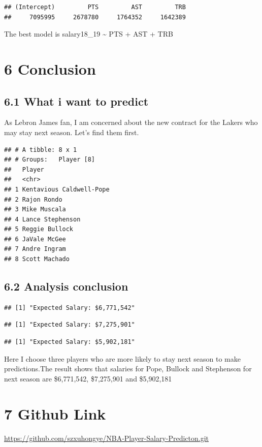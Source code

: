 \documentclass[]{article}
\begin{document}
\begin{verbatim}
## (Intercept)         PTS         AST         TRB 
##     7095995     2678780     1764352     1642389
\end{verbatim}

The best model is salary18\_19 \textasciitilde{} PTS + AST + TRB

\section{6 Conclusion}\label{conclusion}

\subsection{6.1 What i want to predict}\label{what-i-want-to-predict}

As Lebron James fan, I am concerned about the new contract for the
Lakers who may stay next season. Let's find them first.

\begin{verbatim}
## # A tibble: 8 x 1
## # Groups:   Player [8]
##   Player                  
##   <chr>                   
## 1 Kentavious Caldwell-Pope
## 2 Rajon Rondo             
## 3 Mike Muscala            
## 4 Lance Stephenson        
## 5 Reggie Bullock          
## 6 JaVale McGee            
## 7 Andre Ingram            
## 8 Scott Machado
\end{verbatim}

\subsection{6.2 Analysis conclusion}\label{analysis-conclusion}

\begin{verbatim}
## [1] "Expected Salary: $6,771,542"
\end{verbatim}

\begin{verbatim}
## [1] "Expected Salary: $7,275,901"
\end{verbatim}

\begin{verbatim}
## [1] "Expected Salary: $5,902,181"
\end{verbatim}

Here I choose three players who are more likely to stay next season to
make predictions.The result shows that salaries for Pope, Bullock and
Stephenson for next season are \$6,771,542, \$7,275,901 and \$5,902,181

\section{7 Github Link}\label{github-link}

\url{https://github.com/szxuhongye/NBA-Player-Salary-Predicton.git}
\end{document}
